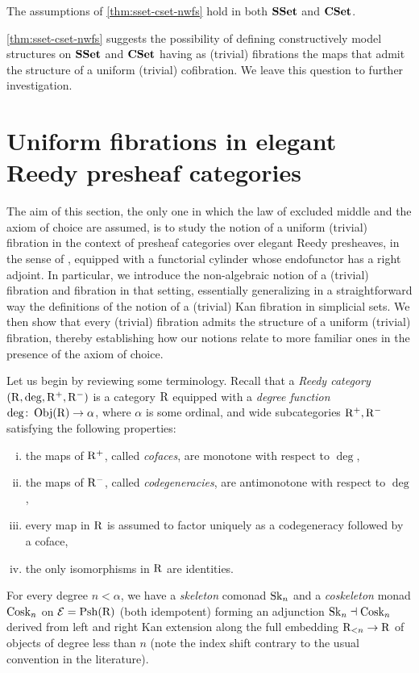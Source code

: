 \documentclass[reqno,10pt,a4paper,oneside,draft]{amsart}
\begin{document}
\begin{example}
The assumptions of \cref{thm:sset-cset-nwfs} hold in both $\mathbf{SSet}$ and $\mathbf{CSet}$.
\end{example}

\cref{thm:sset-cset-nwfs} suggests the possibility of defining constructively model structures on $\mathbf{SSet}$ and $\mathbf{CSet}$ having as (trivial) fibrations the maps that admit the structure of a uniform (trivial) cofibration.
We leave this question to further investigation.


\section{Uniform fibrations in elegant Reedy presheaf categories}
\label{sec:non-alg}

The aim of this section, the only one in which the law of excluded middle and the axiom of choice are assumed, is to study the notion of a uniform (trivial) fibration in the context of presheaf categories over elegant Reedy presheaves, in the sense of \cite{bergner-rezk-elegant}, equipped with a functorial cylinder whose endofunctor has a right adjoint.
In particular, we introduce the non-algebraic notion of a (trivial) fibration and fibration in that setting, essentially generalizing in a straightforward way the definitions of the notion of a (trivial) Kan fibration in simplicial sets.
We then show that every (trivial) fibration admits the structure of a uniform (trivial) fibration, thereby establishing how our notions relate to more familiar ones in the presence of the axiom of choice.

Let us begin by reviewing some terminology.
Recall that a \emph{Reedy category} $(\mathrm{R}, \deg, \mathrm{R}^+, \mathrm{R}^-)$ is a category $\mathrm{R}$ equipped with a \emph{degree function} $\deg \colon \operatorname{Obj}(\mathrm{R}) \to \alpha$, where $\alpha$ is some ordinal, and wide subcategories $\mathrm{R}^+, \mathrm{R}^-$ satisfying the following properties:
\begin{enumerate}[(i)]
\item the maps of $\mathrm{R}^+$, called \emph{cofaces}, are monotone with respect to $\deg$,
\item the maps of $\mathrm{R}^-$, called \emph{codegeneracies}, are antimonotone with respect to $\deg$,
\item every map in $\mathrm{R}$ is assumed to factor uniquely as a codegeneracy followed by a coface,
\item the only isomorphisms in $\mathrm{R}$ are identities.
\end{enumerate}
For every degree $n < \alpha$, we have a \emph{skeleton} comonad $\operatorname{Sk}_n$ and a \emph{coskeleton} monad $\operatorname{Cosk}_n$ on $\mathcal{E} = \mathrm{Psh}(\mathrm{R})$ (both idempotent) forming an adjunction $\operatorname{Sk}_n \dashv \operatorname{Cosk}_n$ derived from left and right Kan extension along the full embedding $\mathrm{R}_{<n} \to \mathrm{R}$ of objects of degree less than $n$ (note the index shift contrary to the usual convention in the literature).
\end{document}
